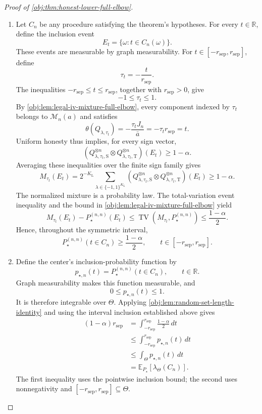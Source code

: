 \documentclass[11pt]{article}
\begin{document}
\begin{proof}[Proof of \cref{obj:thm:honest-lower-full-elbow}]
\begin{enumerate}
\item Let \(C_n\) be any procedure satisfying the theorem's hypotheses. For every \(t\in\mathbb R\), define the inclusion event
\[
E_t=\{\omega:t\in C_n(\omega)\}.
\]
These events are measurable by graph measurability. For \(t\in[-r_{\mathrm{sep}},r_{\mathrm{sep}}]\), define
\[
\tau_t=-\frac{t}{r_{\mathrm{sep}}}.
\]
The inequalities \(-r_{\mathrm{sep}}\le t\le r_{\mathrm{sep}}\), together with \(r_{\mathrm{sep}}>0\), give
\[
-1\le\tau_t\le1.
\]
By \cref{obj:lem:legal-iv-mixture-full-elbow}, every component indexed by \(\tau_t\) belongs to \(\mathcal M_n(a)\) and satisfies
\[
\theta(Q_{\lambda,\tau_t})
=-\frac{\tau_tJ_n}{\bar a}
=-\tau_t r_{\mathrm{sep}}
=t.
\]
Uniform honesty thus implies, for every sign vector,
\[
\left(
Q_{\lambda,\tau_t,\mathrm S}^{\otimes n}
\otimes Q_{\lambda,\tau_t,\mathrm T}^{\otimes n}
\right)(E_t)\ge1-\alpha.
\]
Averaging these inequalities over the finite sign family gives
\[
M_{\tau_t}(E_t)
=
2^{-K_{\mathrm L}}
\sum_{\lambda\in\{-1,1\}^{K_{\mathrm L}}}
\left(
Q_{\lambda,\tau_t,\mathrm S}^{\otimes n}
\otimes Q_{\lambda,\tau_t,\mathrm T}^{\otimes n}
\right)(E_t)
\ge1-\alpha.
\]
The normalized mixture is a probability law. The total-variation event inequality and the bound in \cref{obj:lem:legal-iv-mixture-full-elbow} yield
\[
M_{\tau_t}(E_t)-P_{\star}^{(n,n)}(E_t)
\le
\operatorname{TV}(M_{\tau_t},P_{\star}^{(n,n)})
\le\frac{1-\alpha}{2}.
\]
Hence, throughout the symmetric interval,
\[
P_{\star}^{(n,n)}(t\in C_n)
\ge\frac{1-\alpha}{2},
\qquad
t\in[-r_{\mathrm{sep}},r_{\mathrm{sep}}].
\]

\item Define the center's inclusion-probability function by
\[
p_{\star,n}(t)=P_{\star}^{(n,n)}(t\in C_n),
\qquad t\in\mathbb R.
\]
Graph measurability makes this function measurable, and
\[
0\le p_{\star,n}(t)\le1.
\]
It is therefore integrable over \(\Theta\). Applying \cref{obj:lem:random-set-length-identity} and using the interval inclusion established above gives
\[
\begin{aligned}
(1-\alpha)r_{\mathrm{sep}}
&=\int_{-r_{\mathrm{sep}}}^{r_{\mathrm{sep}}}
       \frac{1-\alpha}{2}\,dt\\
&\le\int_{-r_{\mathrm{sep}}}^{r_{\mathrm{sep}}}
       p_{\star,n}(t)\,dt\\
&\le\int_{\Theta}p_{\star,n}(t)\,dt\\
&=\mathbb E_{P_{\star}}
       \!\left[\lambda_{\Theta}(C_n)\right].
\end{aligned}
\]
The first inequality uses the pointwise inclusion bound; the second uses nonnegativity and
\([-r_{\mathrm{sep}},r_{\mathrm{sep}}]\subseteq\Theta\).


\end{enumerate}
\end{proof}
\end{document}
